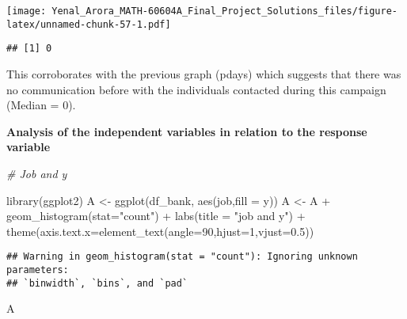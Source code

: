 \documentclass[
]{article}
\newenvironment{Shaded}{\begin{snugshade}}{\end{snugshade}}
\newcommand{\AttributeTok}[1]{\textcolor[rgb]{0.77,0.63,0.00}{#1}}
\newcommand{\CommentTok}[1]{\textcolor[rgb]{0.56,0.35,0.01}{\textit{#1}}}
\newcommand{\DecValTok}[1]{\textcolor[rgb]{0.00,0.00,0.81}{#1}}
\newcommand{\FloatTok}[1]{\textcolor[rgb]{0.00,0.00,0.81}{#1}}
\newcommand{\FunctionTok}[1]{\textcolor[rgb]{0.00,0.00,0.00}{#1}}
\newcommand{\NormalTok}[1]{#1}
\newcommand{\OtherTok}[1]{\textcolor[rgb]{0.56,0.35,0.01}{#1}}
\newcommand{\SpecialCharTok}[1]{\textcolor[rgb]{0.00,0.00,0.00}{#1}}
\newcommand{\StringTok}[1]{\textcolor[rgb]{0.31,0.60,0.02}{#1}}
\begin{document}
\texttt{[image: Yenal\_Arora\_MATH-60604A\_Final\_Project\_Solutions\_files/figure-latex/unnamed-chunk-57-1.pdf]}

\begin{Shaded}
\end{Shaded}

\begin{verbatim}
## [1] 0
\end{verbatim}

This corroborates with the previous graph (pdays) which suggests that
there was no communication before with the individuals contacted during
this campaign (Median = 0).

\textbf{Analysis of the independent variables in relation to the
response variable}

\begin{Shaded}
\begin{Highlighting}[]
\CommentTok{\# Job and y}

\FunctionTok{library}\NormalTok{(ggplot2)}
\NormalTok{A }\OtherTok{\textless{}{-}} \FunctionTok{ggplot}\NormalTok{(df\_bank, }\FunctionTok{aes}\NormalTok{(job,}\AttributeTok{fill =}\NormalTok{ y))}
\NormalTok{A }\OtherTok{\textless{}{-}}\NormalTok{ A }\SpecialCharTok{+} \FunctionTok{geom\_histogram}\NormalTok{(}\AttributeTok{stat=}\StringTok{"count"}\NormalTok{) }\SpecialCharTok{+} \FunctionTok{labs}\NormalTok{(}\AttributeTok{title =} \StringTok{"job and y"}\NormalTok{) }\SpecialCharTok{+}
  \FunctionTok{theme}\NormalTok{(}\AttributeTok{axis.text.x=}\FunctionTok{element\_text}\NormalTok{(}\AttributeTok{angle=}\DecValTok{90}\NormalTok{,}\AttributeTok{hjust=}\DecValTok{1}\NormalTok{,}\AttributeTok{vjust=}\FloatTok{0.5}\NormalTok{))}
\end{Highlighting}
\end{Shaded}

\begin{verbatim}
## Warning in geom_histogram(stat = "count"): Ignoring unknown parameters:
## `binwidth`, `bins`, and `pad`
\end{verbatim}

\begin{Shaded}
\begin{Highlighting}[]
\NormalTok{A}
\end{Highlighting}
\end{Shaded}
\end{document}
